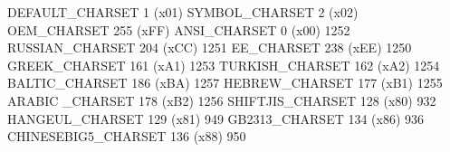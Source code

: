 \begin{DoxyPre}
DEFAULT\_CHARSET           1 (x01)
SYMBOL\_CHARSET            2 (x02)
OEM\_CHARSET             255 (xFF)
ANSI\_CHARSET              0 (x00)            1252
RUSSIAN\_CHARSET         204 (xCC)            1251
EE\_CHARSET              238 (xEE)            1250
GREEK\_CHARSET           161 (xA1)            1253
TURKISH\_CHARSET         162 (xA2)            1254
BALTIC\_CHARSET          186 (xBA)            1257
HEBREW\_CHARSET          177 (xB1)            1255
ARABIC \_CHARSET         178 (xB2)            1256
SHIFTJIS\_CHARSET        128 (x80)             932
HANGEUL\_CHARSET         129 (x81)             949
GB2313\_CHARSET          134 (x86)             936
CHINESEBIG5\_CHARSET     136 (x88)             950
\end{DoxyPre}
 

